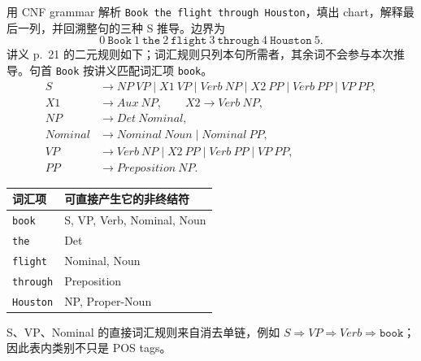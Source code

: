 用 CNF grammar 解析 \texttt{Book the flight through Houston}，填出 chart，解释最后一列，并回溯整句的三种 S 推导。边界为
\[
  0\ \texttt{Book}\ 1\ \texttt{the}\ 2\ \texttt{flight}\ 3\
  \texttt{through}\ 4\ \texttt{Houston}\ 5.
\]
讲义 p.~21 的二元规则如下；词汇规则只列本句所需者，其余词不会参与本次推导。句首 \texttt{Book} 按讲义匹配词汇项 \texttt{book}。
\[
\begin{aligned}
  S&\rightarrow NP\ VP\mid X1\ VP\mid Verb\ NP
       \mid X2\ PP\mid Verb\ PP\mid VP\ PP,\\
  X1&\rightarrow Aux\ NP,\qquad X2\rightarrow Verb\ NP,\\
  NP&\rightarrow Det\ Nominal,\\
  Nominal&\rightarrow Nominal\ Noun\mid Nominal\ PP,\\
  VP&\rightarrow Verb\ NP\mid X2\ PP\mid Verb\ PP\mid VP\ PP,\\
  PP&\rightarrow Preposition\ NP.
\end{aligned}
\]
\begin{center}
\small
\begin{tabularx}{\textwidth}{@{}lX@{}}
  \toprule
  词汇项 & 可直接产生它的非终结符 \\
  \midrule
  \texttt{book} & S, VP, Verb, Nominal, Noun \\
  \texttt{the} & Det \\
  \texttt{flight} & Nominal, Noun \\
  \texttt{through} & Preposition \\
  \texttt{Houston} & NP, Proper-Noun \\
  \bottomrule
\end{tabularx}
\end{center}
S、VP、Nominal 的直接词汇规则来自消去单链，例如 $S\Rightarrow VP\Rightarrow Verb\Rightarrow\texttt{book}$；因此表内类别不只是 POS tags。

